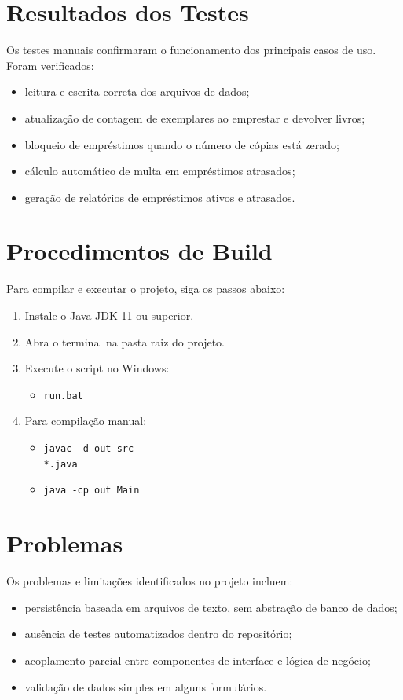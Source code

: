 \documentclass[conference]{IEEEtran}
\begin{document}
\section{Resultados dos Testes}
Os testes manuais confirmaram o funcionamento dos principais casos de uso. Foram verificados:
\begin{itemize}
    \item leitura e escrita correta dos arquivos de dados;
    \item atualização de contagem de exemplares ao emprestar e devolver livros;
    \item bloqueio de empréstimos quando o número de cópias está zerado;
    \item cálculo automático de multa em empréstimos atrasados;
    \item geração de relatórios de empréstimos ativos e atrasados.
\end{itemize}

\section{Procedimentos de Build}
Para compilar e executar o projeto, siga os passos abaixo:
\begin{enumerate}
    \item Instale o Java JDK 11 ou superior.
    \item Abra o terminal na pasta raiz do projeto.
    \item Execute o script no Windows:
    \begin{itemize}
        \item \texttt{run.bat}
    \end{itemize}
    \item Para compilação manual:
    \begin{itemize}
        \item \texttt{javac -d out src\\*.java}
        \item \texttt{java -cp out Main}
    \end{itemize}
\end{enumerate}

\section{Problemas}
Os problemas e limitações identificados no projeto incluem:
\begin{itemize}
    \item persistência baseada em arquivos de texto, sem abstração de banco de dados;
    \item ausência de testes automatizados dentro do repositório;
    \item acoplamento parcial entre componentes de interface e lógica de negócio;
    \item validação de dados simples em alguns formulários.
\end{itemize}
\end{document}
